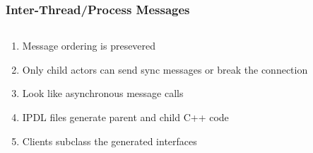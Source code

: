 \documentclass[
	notes=none,
	aspectratio=169
]{beamer}
\begin{document}

\begin{frame}
\frametitle{Inter-Thread/Process Messages}

\begin{columns}[T]
\begin{column}[T]{1.0\textwidth}
\setlength{\parskip}{0.5em}

\vspace{1.0cm}
\begin{enumerate}
\setlength{\parskip}{0.5em}
\item Message ordering is presevered
\item Only child actors can send sync messages or break the connection
\item Look like asynchronous message calls
\item IPDL files generate parent and child C++ code
\item Clients subclass the generated interfaces
\end{enumerate}

\end{column}
\end{columns}

\end{frame}


\begin{frame}
\frametitle{}

\begin{columns}[T]
\begin{column}[T]{0.5\textwidth}
\setlength{\parskip}{0.5em}

\vspace{0.5cm}



\end{column}
\begin{column}[T]{0.5\textwidth}
\setlength{\parskip}{0.5em}

\vspace{0.5cm}





\end{column}
\end{columns}

\end{frame}
\note{
\begin{enumerate}
\item -
\end{enumerate}
}
\end{document}
